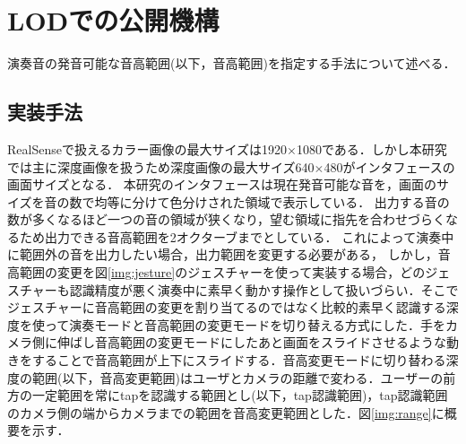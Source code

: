 \chapter{LODでの公開機構}
演奏音の発音可能な音高範囲(以下，音高範囲)を指定する手法について述べる．

\section{実装手法}
RealSenseで扱えるカラー画像の最大サイズは1920$\times$1080である．しかし本研究では主に深度画像を扱うため深度画像の最大サイズ640$\times$480がインタフェースの画面サイズとなる．
本研究のインタフェースは現在発音可能な音を，画面のサイズを音の数で均等に分けて色分けされた領域で表示している．
出力する音の数が多くなるほど一つの音の領域が狭くなり，望む領域に指先を合わせづらくなるため出力できる音高範囲を2オクターブまでとしている．
これによって演奏中に範囲外の音を出力したい場合，出力範囲を変更する必要がある，
しかし，音高範囲の変更を図\ref{img:jesture}のジェスチャーを使って実装する場合，どのジェスチャーも認識精度が悪く演奏中に素早く動かす操作として扱いづらい．そこでジェスチャーに音高範囲の変更を割り当てるのではなく比較的素早く認識する深度を使って演奏モードと音高範囲の変更モードを切り替える方式にした．手をカメラ側に伸ばし音高範囲の変更モードにしたあと画面をスライドさせるような動きをすることで音高範囲が上下にスライドする．音高変更モードに切り替わる深度の範囲(以下，音高変更範囲)はユーザとカメラの距離で変わる．ユーザーの前方の一定範囲を常にtapを認識する範囲とし(以下，tap認識範囲)，tap認識範囲のカメラ側の端からカメラまでの範囲を音高変更範囲とした．図\ref{img:range}に概要を示す．
